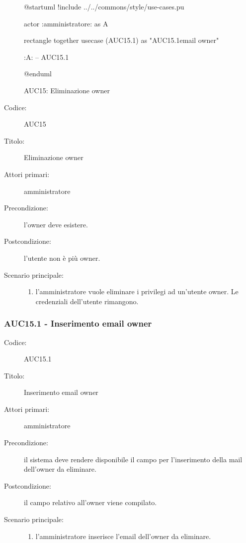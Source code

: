 \documentclass[../../../analisi-dei-requisiti.tex]{subfiles}
\begin{document}
\begin{figure}[H]
  \centering
  \begin{plantuml}
  @startuml
  !include ../../commons/style/use-cases.pu

  actor :amministratore: as A

  rectangle {
    together {
      usecase (AUC15.1) as "AUC15.1\nInserimento email owner"
    }
  }

  :A: -- AUC15.1

  @enduml
  \end{plantuml}
  \caption{AUC15: Eliminazione owner}
  \label{fig:auc15}
\end{figure}

\begin{description}
  \item[Codice:] AUC15
  \item[Titolo:] Eliminazione owner
  \item[Attori primari:] amministratore
  \item[Precondizione:] l'owner deve esistere.
  \item[Postcondizione:] l'utente non è più owner.
  \item[Scenario principale:]
  \begin{enumerate}
    \item l'amministratore vuole eliminare i privilegi ad un'utente owner. Le credenziali dell'utente rimangono.
  \end{enumerate}
\end{description}

\subsubsection{AUC15.1 - Inserimento email owner}%
\label{subs:AUC15.1}
\begin{description}
  \item[Codice:] AUC15.1
  \item[Titolo:] Inserimento email owner
  \item[Attori primari:] amministratore
  \item[Precondizione:] il sistema deve rendere disponibile il campo per l'inserimento della mail dell'owner da eliminare.
  \item[Postcondizione:] il campo relativo all'owner viene compilato.
  \item[Scenario principale:]
  \begin{enumerate}
    \item l'amministratore inserisce l'email dell'owner da eliminare.
  \end{enumerate}
\end{description}
\end{document}
